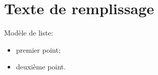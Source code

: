 \documentclass[fleqn,10pt]{ArtEcoFoG} %
\begin{document}
\section{Texte de remplissage}\label{sec:remplissage}
 
\lipsum

Modèle de liste:
\begin{itemize}
  \item premier point;
  \item deuxième point.
\end{itemize}






\end{document}
